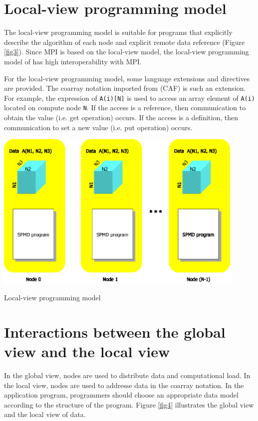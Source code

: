 \section{Local-view programming model}

The local-view programming model is suitable for programs that
explicitly describe the algorithm of each node and explicit remote
data reference (Figure \ref{fig3}). Since MPI is based on the local-view
model, the local-view programming model of {\XMP} has high
interoperability with MPI.

For the local-view programming model, some language extensions and 
directives are provided. The coarray notation imported from {\CAF} (CAF)
is such an extension. For example, the expression of {\tt A(i)[N]} is
used to access an array element of {\tt A(i)} located on compute node
{\tt N}.
%
If the access is a reference, then communication to obtain the value
(i.e. get operation) occurs. If the access is a definition, then
communication to set a new value (i.e. put operation) occurs.

\begin{myfigure}
\includegraphics[width=12cm]{figs/Fig3.eps}
  \caption{Local-view programming model}
\label{fig3}
\end{myfigure}

\section{Interactions between the global view and the local view}

In the global view, nodes are used to distribute data and computational
load. In the local view, nodes are used to addresse data in the coarray
notation.
%
In the application program,
programmers should choose an appropriate data model according to the
structure of the program. Figure \ref{fig4} illustrates the global view
and the local view of data.

